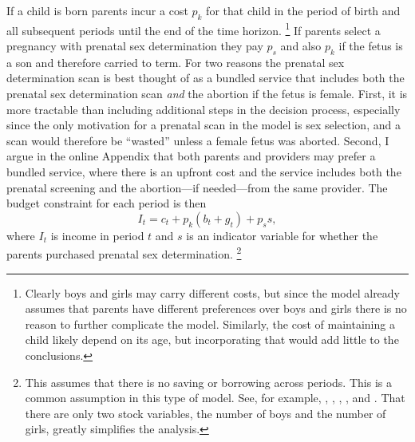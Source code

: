 \documentclass[12pt,letterpaper]{article}
\begin{document}
If a child is born parents incur a cost $p_k$ for
that child in the period of birth and all subsequent periods
until the end of the time horizon.%
\footnote{
Clearly boys and girls may carry different costs, but since 
the model already assumes that
parents have different preferences over boys and
girls there is no reason to further complicate the model.
Similarly, the cost of maintaining a child likely depend on 
its age, but incorporating that would add little to 
the conclusions.
}
If parents select a pregnancy with prenatal sex determination
they pay $p_s$ and also $p_k$ if the fetus is a son
and therefore carried to term.
For two reasons the prenatal sex determination scan is best thought of as
a bundled service that includes both the prenatal sex determination scan 
\emph{and} the abortion if the fetus is female.
First, it is more tractable than including additional steps in
the decision process, especially since the only motivation for
a prenatal scan in the model is sex selection, and a scan would
therefore be ``wasted'' unless a female fetus was aborted.
Second, I argue in the online Appendix that both parents and providers 
may prefer a bundled service, where there is an upfront cost and the service 
includes both the prenatal screening and the abortion---if needed---from the 
same provider.
The budget constraint for each period is then
\begin{equation}
I_t = c_t + p_k(b_t + g_t) + p_s s,
\end{equation}
where $I_t$ is income in period $t$
and
$s$ is an indicator variable for whether the 
parents purchased prenatal sex determination.%
\footnote{
This assumes that there is no saving or borrowing
across periods.
This is a common assumption in this type of model.
See, for example, 
\citet{Heckman1976},
\citet{wolpin84},
\citet{rosenzweig85},
\citet{Newman1988},
and
\citet{Leung1991}.
That there are only two stock variables, the number
of boys and the number of girls, greatly simplifies the analysis.
}
\end{document}
